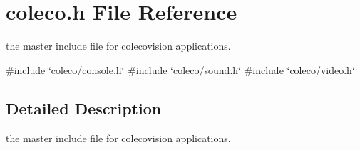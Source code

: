 \hypertarget{a00059}{}\section{coleco.\+h File Reference}
\label{a00059}


the master include file for colecovision applications.  


{\ttfamily \#include \char`\"{}coleco/console.\+h\char`\"{}}\newline
{\ttfamily \#include \char`\"{}coleco/sound.\+h\char`\"{}}\newline
{\ttfamily \#include \char`\"{}coleco/video.\+h\char`\"{}}\newline


\subsection{Detailed Description}
the master include file for colecovision applications. 

